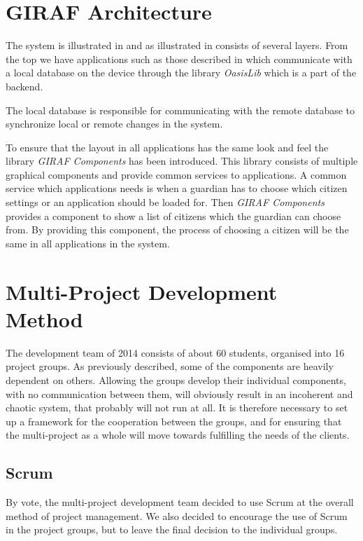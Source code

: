 \section{GIRAF Architecture}
\label{sec:giraf:architecture}
The \giraf system is illustrated in  and as illustrated in consists of several layers. From the top we have applications such as those described in  which communicate with a local database on the device through the library \textit{OasisLib} which is a part of the \giraf backend.

The local database is responsible for communicating with the remote database to synchronize local or remote changes in the system.

To ensure that the layout in all applications has the same look and feel the library \textit{GIRAF Components} has been introduced.
This library consists of multiple graphical components and provide common services to applications.
A common service which applications needs is when a guardian has to choose which citizen settings or an application should be loaded for. Then \textit{GIRAF Components} provides a component to show a list of citizens which the guardian can choose from. By providing this component, the process of choosing a citizen will be the same in all applications in the \giraf system.


\section{Multi-Project Development Method}\label{sec:giraf:development}
The \giraf development team of 2014 consists of about 60 students, organised into 16 project groups. 
As previously described, some of the \giraf components are heavily dependent on others. 
Allowing the groups develop their individual components, with no communication between them, will obviously result in an incoherent and chaotic system, that probably will not run at all. 
It is therefore necessary to set up a framework for the cooperation between the groups, and for ensuring that the multi-project as a whole will move towards fulfilling the needs of the clients.

\subsection{Scrum}
By vote, the multi-project development team decided to use Scrum at the overall method of project management. 
We also decided to encourage the use of Scrum in the project groups, but to leave the final decision to the individual groups. 

